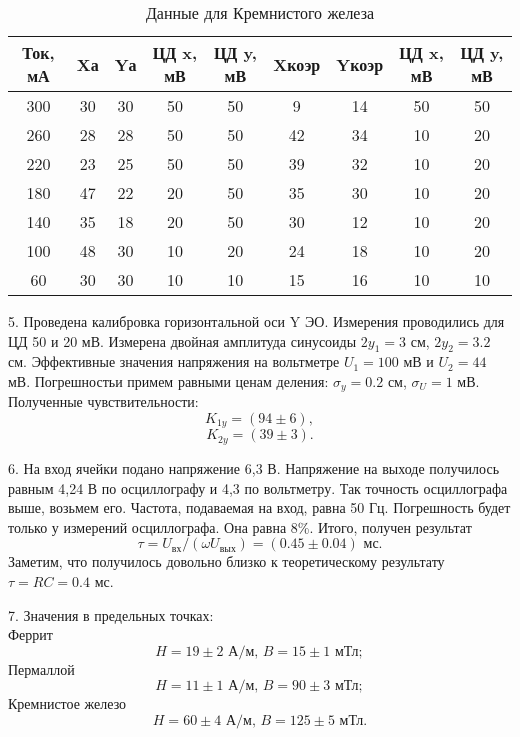 \begin{table}
    \centering
    \begin{tabular}{|c|c|c|c|c|c|c|c|c|}
        \hline
        Ток, мА & Xа & Yа & ЦД x, мВ & ЦД y, мВ & Xкоэр & Yкоэр & ЦД x, мВ & ЦД y, мВ \\
		\hline
		300 & 30 & 30 & 50 & 50 & 9 & 14 & 50 & 50 \\
		\hline
		260 & 28 & 28 & 50 & 50 & 42 & 34 & 10 & 20 \\
		\hline
		220 & 23 & 25 & 50 & 50 & 39 & 32 & 10 & 20 \\
		\hline
		180 & 47 & 22 & 20 & 50 & 35 & 30 & 10 & 20 \\
		\hline
		140 & 35 & 18 & 20 & 50 & 30 & 12 & 10 & 20 \\
		\hline
		100 & 48 & 30 & 10 & 20 & 24 & 18 & 10 & 20 \\
		\hline
		60 & 30 & 30 & 10 & 10 & 15 & 16 & 10 & 10 \\
		\hline
    \end{tabular}
    \caption{Данные для Кремнистого железа}
    \label{tab:3}
\end{table}

5. Проведена калибровка горизонтальной оси Y ЭО. Измерения проводились для ЦД 50 и 20 мВ. Измерена двойная амплитуда синусоиды $2y_1 = 3$ см, $2y_2 = 3.2$ см. Эффективные значения напряжения на вольтметре $U_1 = 100$ мВ и $U_2 = 44$ мВ. Погрешностьи примем равными ценам деления: $\sigma_y = 0.2$ см, $\sigma_U = 1$ мВ.
Полученные чувствительности:
\[K_{1y} = (94 \pm 6), \]
\[K_{2y} = (39 \pm 3). \]

6. На вход ячейки подано напряжение 6,3 В. Напряжение на выходе получилось равным 4,24 В по осциллографу и 4,3 по вольтметру. Так точность осциллографа выше, возьмем его. Частота, подаваемая на вход, равна 50 Гц. Погрешность будет только у измерений осциллографа. Она равна 8\%. Итого, получен результат
\[\tau = U_\text{вх}/(\omega U_\text{вых}) = (0.45 \pm 0.04) \text{ мс}.\]
Заметим, что получилось довольно близко к теоретическому результату $\tau = RC = 0.4$ мс.

7. Значения в предельных точках:\\
Феррит\\
\[H = 19 \pm 2\text{ А/м,     } B = 15 \pm 1 \text{ мТл};  \]
Пермаллой\\
\[H = 11 \pm 1\text{ А/м,     } B = 90 \pm 3 \text{ мТл};  \]
Кремнистое железо\\
\[H = 60 \pm 4\text{ А/м,     } B = 125 \pm 5 \text{ мТл}.  \]

